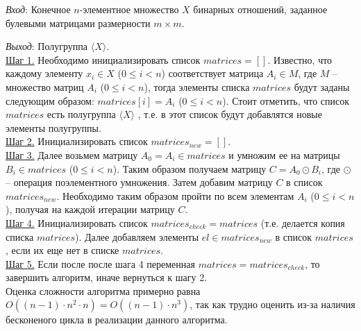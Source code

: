 \documentclass[bachelor, och, labwork]{shiza}
\begin{document}
        \textit{Вход}: Конечное $n$-элементное множество $X$ бинарных отношений, заданное булевыми матрицами размерности $m \times m$.

        \textit{Выход}: Полугруппа $\langle X \rangle$.\\
        \underline{Шаг 1.} Необходимо инициализировать список $matrices = []$. Известно, что каждому элементу $x_i \in X$ ($0 \leq i < n$)
        соответствует матрица $A_i \in M$, где $M$ -- множество матриц $A_i$ ($0 \leq i < n$), тогда элементы списка $matrices$ будут
        заданы следующим образом: $matrices[i] = A_i$ ($0 \leq i < n$). Стоит отметить, что список $matrices$ есть полугруппа $\langle X \rangle$
        , т.е. в этот список будут добавлятся новые элементы полугруппы.\\
        \underline{Шаг 2.} Инициализировать список $matrices_{new} = []$.\\
        \underline{Шаг 3.} Далее возьмем матрицу $A_0 = A_i \in matrices$ и умножим ее на матрицы $B_i \in matrices$ ($0 \leq i < n$).
        Таким образом получаем матрицу $C = A_0 \odot B_i$, где $\odot$ -- операция поэлементного умножения. Затем добавим матрицу $C$
        в список $matrices_{new}$. Необходимо таким образом пройти по всем элементам $A_i$ ($0 \leq i < n$), получая на каждой итерации 
        матрицу $C$. \\
        \underline{Шаг 4.} Инициализировать список $matrices_{check} = matrices$ (т.е. делается копия списка $matrices$). Далее добавляем
        элементы $el \in matrices_{new}$ в список $matrices$, если их еще нет в списке $matrices$. \\
        \underline{Шаг 5.} Если после после шага 4 переменная $matrices = matrices_{check}$, то завершить алгоритм, иначе вернуться к шагу 2. \\

        Оценка сложности алгоритма примерно равна $O((n - 1) \cdot n^2 \cdot n) = O((n-1) \cdot n^3)$, так как трудно оценить
        из-за наличия бесконеного цикла в реализации данного алгоритма.\\


\end{document}
